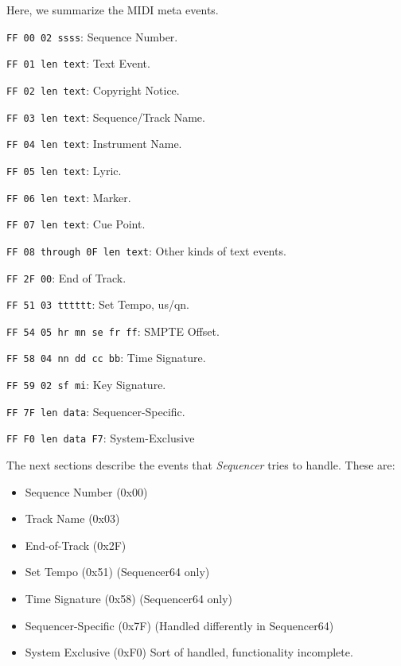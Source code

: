Here, we summarize the MIDI meta events.

   \begin{enumber}
      \item \texttt{FF 00 02 ssss}: Sequence Number.
      \item \texttt{FF 01 len text}: Text Event.
      \item \texttt{FF 02 len text}: Copyright Notice.
      \item \texttt{FF 03 len text}: Sequence/Track Name.
      \item \texttt{FF 04 len text}: Instrument Name.
      \item \texttt{FF 05 len text}: Lyric.
      \item \texttt{FF 06 len text}: Marker.
      \item \texttt{FF 07 len text}: Cue Point.
      \item \texttt{FF 08 through 0F len text}: Other kinds of  text events.
      \item \texttt{FF 2F 00}: End of Track.
      \item \texttt{FF 51 03 tttttt}: Set Tempo, us/qn.
      \item \texttt{FF 54 05 hr mn se fr ff}: SMPTE Offset.
      \item \texttt{FF 58 04 nn dd cc bb}: Time Signature.
      \item \texttt{FF 59 02 sf mi}: Key Signature.
      \item \texttt{FF 7F len data}: Sequencer-Specific.
      \item \texttt{FF F0 len data F7}: System-Exclusive
   \end{enumber}

The next sections describe the events that
\textsl{Sequencer} tries to handle.
These are:

   \begin{itemize}
      \item Sequence Number (0x00)
      \item Track Name (0x03)
      \item End-of-Track (0x2F)
      \item Set Tempo (0x51) (Sequencer64 only)
      \item Time Signature (0x58) (Sequencer64 only)
      \item Sequencer-Specific (0x7F) (Handled differently in Sequencer64)
      \item System Exclusive (0xF0) Sort of handled, functionality incomplete.
   \end{itemize}

